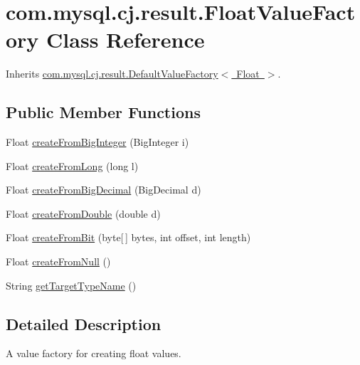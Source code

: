 \hypertarget{classcom_1_1mysql_1_1cj_1_1result_1_1_float_value_factory}{}\section{com.\+mysql.\+cj.\+result.\+Float\+Value\+Factory Class Reference}
\label{classcom_1_1mysql_1_1cj_1_1result_1_1_float_value_factory}


Inherits \mbox{\hyperlink{classcom_1_1mysql_1_1cj_1_1result_1_1_default_value_factory}{com.\+mysql.\+cj.\+result.\+Default\+Value\+Factory$<$ Float $>$}}.

\subsection*{Public Member Functions}
\begin{DoxyCompactItemize}
\item 
Float \mbox{\hyperlink{classcom_1_1mysql_1_1cj_1_1result_1_1_float_value_factory_a0dfaaba7d4aff7995021009f6d88d1fa}{create\+From\+Big\+Integer}} (Big\+Integer i)
\item 
Float \mbox{\hyperlink{classcom_1_1mysql_1_1cj_1_1result_1_1_float_value_factory_abf1b10f3d17d8ee2b2860509ddcd4066}{create\+From\+Long}} (long l)
\item 
Float \mbox{\hyperlink{classcom_1_1mysql_1_1cj_1_1result_1_1_float_value_factory_a9a644404852f6528743312d6b6485cba}{create\+From\+Big\+Decimal}} (Big\+Decimal d)
\item 
Float \mbox{\hyperlink{classcom_1_1mysql_1_1cj_1_1result_1_1_float_value_factory_a7ddfc40bfc97a0c600b7e4279cf72e50}{create\+From\+Double}} (double d)
\item 
Float \mbox{\hyperlink{classcom_1_1mysql_1_1cj_1_1result_1_1_float_value_factory_a58d315302a3bd1d91bf84f12c199ee7a}{create\+From\+Bit}} (byte\mbox{[}$\,$\mbox{]} bytes, int offset, int length)
\item 
Float \mbox{\hyperlink{classcom_1_1mysql_1_1cj_1_1result_1_1_float_value_factory_a3ebb1a3dc2d6ddec958d9e399e04098c}{create\+From\+Null}} ()
\item 
String \mbox{\hyperlink{classcom_1_1mysql_1_1cj_1_1result_1_1_float_value_factory_ab08cb27a013fa18782ec3fdfa9a265c8}{get\+Target\+Type\+Name}} ()
\end{DoxyCompactItemize}


\subsection{Detailed Description}
A value factory for creating float values. 

